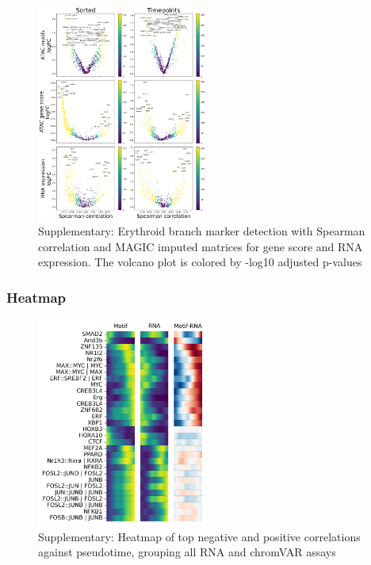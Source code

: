 \documentclass[a4paper]{article}
\begin{document}
\begin{figure}[!htb]
  \centering
  \includegraphics[width=0.5\textwidth]{../figures/hematopoiesis/Myeloid DC_40_107_smooth_magic_single_branch_volcanos_motifs.png}
  \caption{Supplementary: Erythroid branch marker detection with Spearman correlation and MAGIC imputed matrices for gene score and RNA expression. The volcano plot is colored by -log10 adjusted p-values}
\end{figure}

\FloatBarrier
\subsubsection{Heatmap}

\begin{figure}[!htb]
  \centering
  \includegraphics[width=0.5\textwidth]{../figures/hematopoiesis/Myeloid DC_40_107_single_smooth_none_heatmap_grouped_assays.png}
  \caption{Supplementary: Heatmap of top negative and positive correlations against pseudotime, grouping all RNA and chromVAR assays}
\end{figure}
\end{document}

